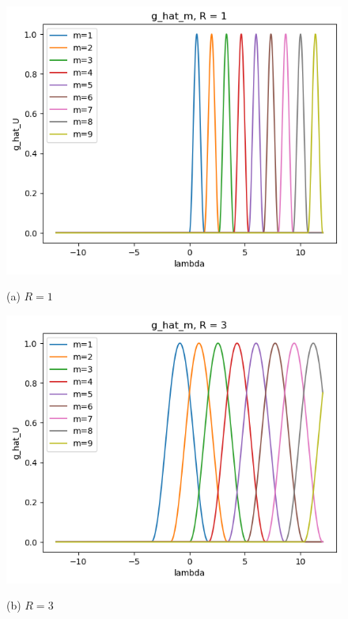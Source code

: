 \documentclass[11pt]{article}
\begin{document}
\begin{solution}
\begin{figure}
    \centering
    \begin{minipage}[t]{0.32\textwidth}
    \centerline{\includegraphics[width=\textwidth]{q3_a.png}}
    \centerline{(a) $R=1$}
    \end{minipage}
    \hfill
    \begin{minipage}[t]{0.32\textwidth}    \centerline{\includegraphics[width=\textwidth]{q3_b.png}}
    \centerline{(b) $R=3$}
    \end{minipage}
    \hfill

\end{figure}
\end{solution}
\end{document}
